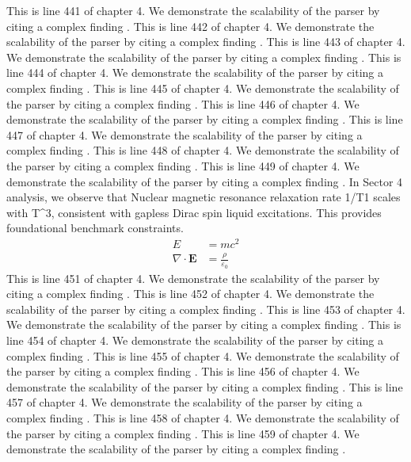 This is line 441 of chapter 4. We demonstrate the scalability of the parser by citing a complex finding \cite{ref4_441}.
This is line 442 of chapter 4. We demonstrate the scalability of the parser by citing a complex finding \cite{ref4_442}.
This is line 443 of chapter 4. We demonstrate the scalability of the parser by citing a complex finding \cite{ref4_443}.
This is line 444 of chapter 4. We demonstrate the scalability of the parser by citing a complex finding \cite{ref4_444}.
This is line 445 of chapter 4. We demonstrate the scalability of the parser by citing a complex finding \cite{ref4_445}.
This is line 446 of chapter 4. We demonstrate the scalability of the parser by citing a complex finding \cite{ref4_446}.
This is line 447 of chapter 4. We demonstrate the scalability of the parser by citing a complex finding \cite{ref4_447}.
This is line 448 of chapter 4. We demonstrate the scalability of the parser by citing a complex finding \cite{ref4_448}.
This is line 449 of chapter 4. We demonstrate the scalability of the parser by citing a complex finding \cite{ref4_449}.
In Sector 4 analysis, we observe that Nuclear magnetic resonance relaxation rate 1/T1 scales with T^3, consistent with gapless Dirac spin liquid excitations. This provides foundational benchmark constraints.
\begin{align*}
  E &= mc^2 \\
  \nabla \cdot \mathbf{E} &= \frac{\rho}{\varepsilon_0}
\end{align*}
This is line 451 of chapter 4. We demonstrate the scalability of the parser by citing a complex finding \cite{ref4_451}.
This is line 452 of chapter 4. We demonstrate the scalability of the parser by citing a complex finding \cite{ref4_452}.
This is line 453 of chapter 4. We demonstrate the scalability of the parser by citing a complex finding \cite{ref4_453}.
This is line 454 of chapter 4. We demonstrate the scalability of the parser by citing a complex finding \cite{ref4_454}.
This is line 455 of chapter 4. We demonstrate the scalability of the parser by citing a complex finding \cite{ref4_455}.
This is line 456 of chapter 4. We demonstrate the scalability of the parser by citing a complex finding \cite{ref4_456}.
This is line 457 of chapter 4. We demonstrate the scalability of the parser by citing a complex finding \cite{ref4_457}.
This is line 458 of chapter 4. We demonstrate the scalability of the parser by citing a complex finding \cite{ref4_458}.
This is line 459 of chapter 4. We demonstrate the scalability of the parser by citing a complex finding \cite{ref4_459}.
